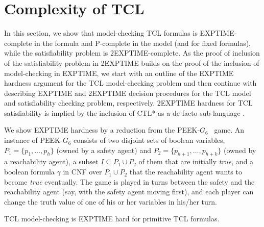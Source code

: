 \documentclass{llncs}
\begin{document}
\section{Complexity of TCL\label{sec.gen.proc}} 

In this section, we show that model-checking TCL formulas is EXPTIME-complete in the formula and P-complete in the model (and for fixed formulas), while the satisfiability problem is 2EXPTIME-complete.
As the proof of inclusion of the satisfiability problem in 2EXPTIME builds on the proof of the inclusion of model-checking in EXPTIME, we start with an outline of the EXPTIME hardness argument for the TCL model-checking problem and then continue with describing EXPTIME and 2EXPTIME decision procedures for the TCL model and satisfiability checking problem, respectively.
2EXPTIME hardness for TCL satisfiability is implied by the inclusion of CTL* as a de-facto sub-language \cite{Vardi+Stockmeyer/85/CTL}.



We show EXPTIME hardness by a reduction from 
the {\sf PEEK-$G_6$}~\cite{SC79} game.
An instance of {\sf PEEK-$G_6$} consists of 
two disjoint sets of boolean variables, 
$P_1=\{p_1,\ldots,p_h\}$ (owned by a safety agent) and 
$P_2=\{p_{h+1},\ldots,p_{h+k}\}$ (owned by a reachability agent), 
a subset $I\subseteq P_1\cup P_2$ of them that are initially {\em true}, 
and a boolean formula $\gamma$ in CNF over 
$P_1\cup P_2$ that the reachability agent wants to become 
{\em true} eventually.
The game is played in turns between the safety and the reachability agent 
(say, with the safety agent moving first), and 
each player can change the truth value of one of his or her variables 
in his/her turn.

\begin{lemma}
\label{lemma.exptime.hard}
TCL model-checking is EXPTIME hard for primitive TCL formulas.
\end{lemma}
\end{document}
